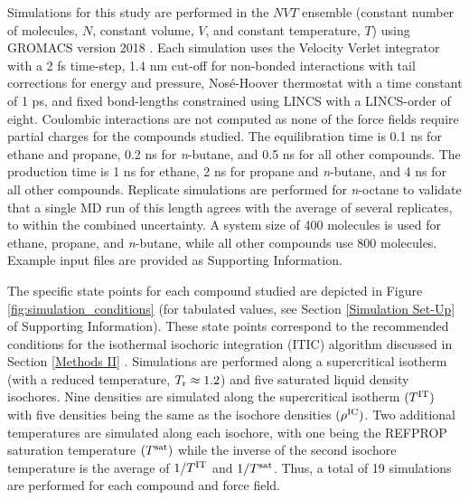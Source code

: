 \documentclass[preprint,letterpaper,floatfix,citeautoscript,aip,jcp]{revtex4-1}
\begin{document}
Simulations for this study are performed in the $NVT$ ensemble (constant number of molecules, $N$, constant volume, $V$, and constant temperature, $T$) using GROMACS version 2018 \cite{GROMACS_2018}. Each simulation uses the Velocity Verlet integrator with a 2 fs time-step, 1.4 nm cut-off 
for non-bonded interactions with tail corrections for energy and pressure, Nos{\'e}-Hoover thermostat with a time constant of 1 ps, and fixed bond-lengths 
constrained using LINCS with a LINCS-order of eight. Coulombic interactions are not computed as none of the force fields require partial charges for the compounds studied. The equilibration time is 0.1 ns for ethane and propane, 0.2 ns for \textit{n}-butane, and 0.5 ns for all other compounds. The production time is 1 ns for ethane, 2 ns for propane and \textit{n}-butane, and 4 ns for all other compounds. Replicate simulations are performed for \textit{n}-octane to validate that a single MD run of this length agrees with the average of several replicates, to within the combined uncertainty. A system size of 400 molecules is used for ethane, propane, and \textit{n}-butane, while all other compounds use 800 molecules. 
Example input files are provided as Supporting Information.

The specific state points for each compound studied are depicted in Figure \ref{fig:simulation_conditions} (for tabulated values, see Section \ref{Simulation Set-Up} of Supporting Information). 
These state points correspond to the recommended conditions for the isothermal isochoric integration (ITIC) algorithm discussed in Section \ref{Methods II} \cite{Mostafa_Diss,Postdoc_1,Mostafa2018}. 
Simulations are performed along a supercritical isotherm (with a reduced temperature, $T_{\rm r} \approx 1.2$) and five saturated liquid density isochores. Nine densities are simulated along the supercritical isotherm $(T^{\rm IT})$ with five densities being the same as the isochore densities $(\rho^{\rm IC})$. Two additional temperatures are simulated along each isochore, with one being the REFPROP saturation temperature $(T^{\rm sat})$ while the inverse of the second isochore temperature is the average of $1/T^{\rm IT}$ and $1/T^{\rm sat}$. Thus, a total of 19 simulations are performed for each compound and force field.
\end{document}
